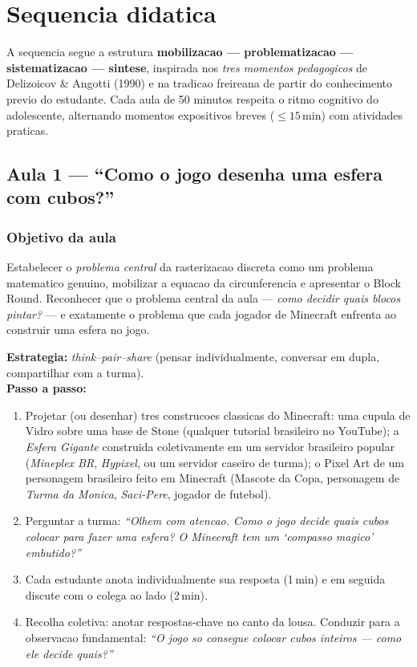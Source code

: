 \documentclass[12pt,a4paper]{scrartcl}
\newcommand{\acc}[1]{\textcolor{accent}{\textbf{#1}}}
\newcommand{\tempo}[1]{\textnormal{\footnotesize\color{bg!90!white}\textsf{#1}}}
\begin{document}
\section{Sequencia didatica}\label{sec:sequencia}

A sequencia segue a estrutura \acc{mobilizacao --- problematizacao --- sistematizacao --- sintese}, inspirada nos \emph{tres momentos pedagogicos} de Delizoicov \& Angotti (1990) e na tradicao freireana de partir do conhecimento previo do estudante. Cada aula de 50 minutos respeita o ritmo cognitivo do adolescente, alternando momentos expositivos breves ($\leq 15$\,min) com atividades praticas.

\subsection{Aula 1 --- \enquote{Como o jogo desenha uma esfera com cubos?}}\label{aula1}

\subsubsection*{Objetivo da aula}
Estabelecer o \emph{problema central} da rasterizacao discreta como um problema matematico genuino, mobilizar a equacao da circunferencia e apresentar o Block Round. Reconhecer que o problema central da aula --- \emph{como decidir quais blocos pintar?} --- e exatamente o problema que cada jogador de Minecraft enfrenta ao construir uma esfera no jogo.

\begin{atividade}[1.1 --- Mobilizacao \quad\tempo{10 min}]
\textbf{Estrategia:} \emph{think--pair--share} (pensar individualmente, conversar em dupla, compartilhar com a turma). \\[0.4em]
\textbf{Passo a passo:}
\begin{enumerate}[leftmargin=1.5em,itemsep=0.2em,topsep=0.3em,nosep]
  \item Projetar (ou desenhar) tres construcoes classicas do Minecraft: uma cupula de Vidro sobre uma base de Stone (qualquer tutorial brasileiro no YouTube); a \emph{Esfera Gigante} construida coletivamente em um servidor brasileiro popular (\emph{Mineplex BR}, \emph{Hypixel}, ou um servidor caseiro de turma); o Pixel Art de um personagem brasileiro feito em Minecraft (Mascote da Copa, personagem de \emph{Turma da Monica}, \emph{Saci-Pere}, jogador de futebol).
  \item Perguntar a turma: \emph{\enquote{Olhem com atencao. Como o jogo decide quais cubos colocar para fazer uma esfera? O Minecraft tem um \enquote{compasso magico} embutido?}}
  \item Cada estudante anota individualmente sua resposta (1\,min) e em seguida discute com o colega ao lado (2\,min).
  \item Recolha coletiva: anotar respostas-chave no canto da lousa. Conduzir para a observacao fundamental: \emph{\enquote{O jogo so consegue colocar cubos inteiros --- como ele decide quais?}}
\end{enumerate}
\end{atividade}
\end{document}
